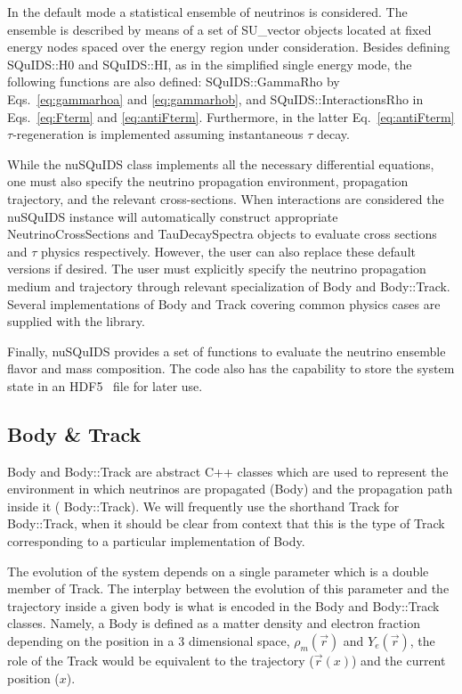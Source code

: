 \documentclass[3p,12pt]{elsarticle}
\newcommand{\ttf}{\ttfamily}
\begin{document}
In the default mode a statistical ensemble of neutrinos is
considered. The ensemble is described by means of a set of {\ttf
  SU\_vector} objects located at fixed  energy nodes spaced over the
energy region under consideration. Besides defining {\ttf SQuIDS::H0}
and {\ttf SQuIDS::HI}, as in the simplified single energy mode, the
following functions are also defined: {\ttf SQuIDS::GammaRho} by
Eqs.~\eqref{eq:gammarhoa} and \eqref{eq:gammarhob}, and {\ttf
  SQuIDS::InteractionsRho} in Eqs.~\eqref{eq:Fterm} and
\eqref{eq:antiFterm}.
Furthermore, in the latter
Eq.~\eqref{eq:antiFterm} $\tau$-regeneration is implemented assuming
instantaneous $\tau$ decay.

While the {\ttf nuSQuIDS} class implements all the necessary
differential equations, one must also specify the neutrino propagation
environment, propagation trajectory, and the relevant cross-sections.  
When interactions are considered the {\ttf nuSQuIDS} instance
will automatically construct appropriate {\ttf NeutrinoCrossSections}
and {\ttf TauDecaySpectra} objects to evaluate cross sections and
$\tau$ physics respectively. However, the user can also replace these
default versions if desired. The user must
explicitly specify the neutrino propagation medium and trajectory
through relevant specialization of {\ttf Body} and {\ttf Body::Track}.
Several implementations of {\ttf Body} and {\ttf Track} covering
common physics cases are supplied with the library. 

Finally, {\ttf nuSQuIDS} provides a set of functions to evaluate the
neutrino ensemble flavor and mass composition. The code also has the
capability to store the system state in an HDF5~\citep{folk1999hdf5}
file for later use.

\subsection{Body \& Track \label{sec:body_track}}

{\ttf Body} and {\ttf Body::Track} are abstract {\ttf C++} classes
which are used to represent the environment in which neutrinos
are propagated ({\ttf Body}) and the propagation path inside it ({\ttf
  Body::Track}). We will frequently use the shorthand {\ttf Track} for {\ttf Body::Track},
 when it should be clear from context that this is the type of {\ttf Track} 
 corresponding to a particular implementation of {\ttf Body}.

The evolution of the system depends on a single parameter which is a
{\ttf double} member of {\ttf Track}. The
interplay between the evolution of this parameter and the trajectory
inside a given body is what is encoded in the {\ttf Body} and 
{\ttf Body::Track} classes. 
Namely, a {\ttf Body} is defined as a matter density and electron
fraction depending on the position in a 3 dimensional space, $\rho_m(\vec{r})$ and
$Y_e(\vec{r})$, the role of the {\ttf Track} would be
equivalent to the trajectory ($\vec{r}(x)$) and the current position ($x$).
\end{document}
